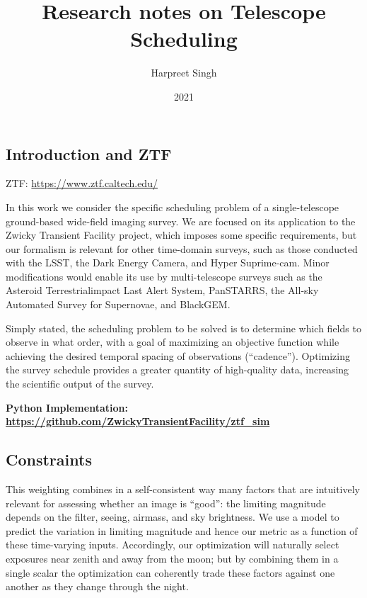 \documentclass{article}
\title{Research notes on Telescope Scheduling}
\author{Harpreet Singh}
\date{2021}
\begin{document}
\maketitle


\section*{\cite{bellm2019zwicky} }

\subsection*{Introduction and ZTF}

ZTF: \url{https://www.ztf.caltech.edu/}

In this work we consider the specific scheduling problem of
a single-telescope ground-based wide-field imaging survey. We
are focused on its application to the Zwicky Transient Facility
project, which imposes some specific requirements, but our
formalism is relevant for other time-domain surveys, such as
those conducted with the LSST, the Dark Energy Camera, 
and Hyper Suprime-cam. Minor modifications would enable its
use by multi-telescope surveys such as the Asteroid Terrestrialimpact
Last Alert System, PanSTARRS, the All-sky Automated Survey for
Supernovae, and BlackGEM.

Simply stated, the scheduling problem to be solved is to
determine which fields to observe in what order, with a goal of
maximizing an objective function while achieving the desired
temporal spacing of observations (“cadence”). Optimizing the
survey schedule provides a greater quantity of high-quality
data, increasing the scientific output of the survey.

\textbf{Python Implementation: \url{https://github.com/ZwickyTransientFacility/ztf_sim}}

\subsection*{Constraints}
This weighting combines in a self-consistent way many
factors that are intuitively relevant for assessing whether an
image is “good”: the limiting magnitude depends on the filter,
seeing, airmass, and sky brightness. We use a model
to predict the variation in limiting magnitude and
hence our metric as a function of these time-varying inputs.
Accordingly, our optimization will naturally select exposures
near zenith and away from the moon; but by combining them in
a single scalar the optimization can coherently trade these
factors against one another as they change through the night.
\end{document}
